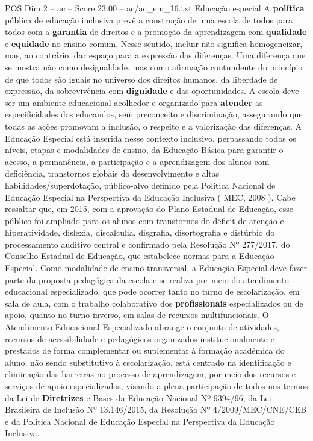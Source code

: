 \begin{textsample}{POS Dim 2 – ac – Score 23.00 – ac/ac\_em\_16.txt}
Educação especial A \textbf{política} pública de educação inclusiva prevê a construção de uma escola de todos para todos com a \textbf{garantia} de direitos e a promoção da aprendizagem com \textbf{qualidade} e \textbf{equidade} no ensino comum.
Nesse sentido, incluir não significa homogeneizar, mas, ao contrário, dar espaço para a expressão das diferenças.
Uma diferença que se mostra não como desigualdade, mas como afirmação contundente do princípio de que todos são iguais no universo dos direitos humanos, da liberdade de expressão, da sobrevivência com \textbf{dignidade} e das oportunidades.
A escola deve ser um ambiente educacional acolhedor e organizado para \textbf{atender} as especificidades dos educandos, sem preconceito e discriminação, assegurando que todas as ações promovam a inclusão, o respeito e a valorização das diferenças.
A Educação Especial está inserida nesse contexto inclusivo, perpassando todos os níveis, etapas e modalidades de ensino, da Educação Básica para garantir o acesso, a permanência, a participação e a aprendizagem dos alunos com deficiência, transtornos globais do desenvolvimento e altas habilidades/superdotação, público-alvo definido pela Política Nacional de Educação Especial na Perspectiva da Educação Inclusiva ( MEC, 2008 ).
Cabe ressaltar que, em 2015, com a aprovação do Plano Estadual de Educação, esse público foi ampliado para os alunos com transtornos do déficit de atenção e hiperatividade, dislexia, discalculia, disgrafia, disortografia e distúrbio do processamento auditivo central e confirmado pela Resolução Nº 277/2017, do Conselho Estadual de Educação, que estabelece normas para a Educação Especial.
Como modalidade de ensino transversal, a Educação Especial deve fazer parte da proposta pedagógica da escola e se realiza por meio do atendimento educacional especializado, que pode ocorrer tanto no turno de escolarização, em sala de aula, com o trabalho colaborativo dos \textbf{profissionais} especializados ou de apoio, quanto no turno inverso, em salas de recursos multifuncionais.
O Atendimento Educacional Especializado abrange o conjunto de atividades, recursos de acessibilidade e pedagógicos organizados institucionalmente e prestados de forma complementar ou suplementar à formação acadêmica do aluno, não sendo substitutivo à escolarização, está centrado na identificação e eliminação das barreiras no processo de aprendizagem, por meio dos recursos e serviços de apoio especializados, visando a plena participação de todos nos termos da Lei de \textbf{Diretrizes} e Bases da Educação Nacional Nº 9394/96, da Lei Brasileira de Inclusão Nº 13.146/2015, da Resolução Nº 4/2009/MEC/CNE/CEB e da Política Nacional de Educação Especial na Perspectiva da Educação Inclusiva.

\end{textsample}
